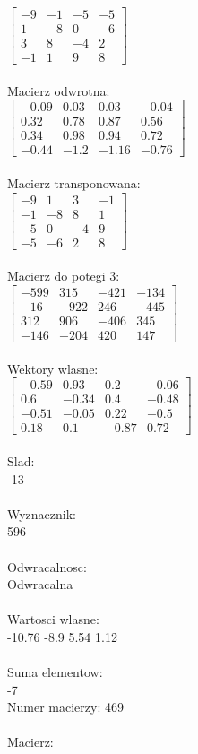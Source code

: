 \documentclass[a4paper,12pt]{article}
\begin{document}
$\begin{bmatrix} -9&-1&-5&-5\\1&-8&0&-6\\3&8&-4&2\\-1&1&9&8 \end{bmatrix}$
\\
\\
Macierz odwrotna:\\

$\begin{bmatrix} -0.09&0.03&0.03&-0.04\\0.32&0.78&0.87&0.56\\0.34&0.98&0.94&0.72\\-0.44&-1.2&-1.16&-0.76 \end{bmatrix}$
\\
\\
Macierz transponowana:\\

$\begin{bmatrix} -9&1&3&-1\\-1&-8&8&1\\-5&0&-4&9\\-5&-6&2&8 \end{bmatrix}$
\\
\\
Macierz do potegi 3:\\

$\begin{bmatrix} -599&315&-421&-134\\-16&-922&246&-445\\312&906&-406&345\\-146&-204&420&147 \end{bmatrix}$
\\
\\
Wektory wlasne:\\

$\begin{bmatrix} -0.59&0.93&0.2&-0.06\\0.6&-0.34&0.4&-0.48\\-0.51&-0.05&0.22&-0.5\\0.18&0.1&-0.87&0.72 \end{bmatrix}$
\\
\\
Slad:\\
-13
\\
\\
Wyznacznik:\\
596
\\
\\
Odwracalnosc:\\
Odwracalna
\\
\\
Wartosci wlasne:\\
-10.76 -8.9 5.54 1.12
\\
\\
Suma elementow:\\
-7
\\
\newpage
Numer macierzy:
469
\\
\\
Macierz:\\
\end{document}
